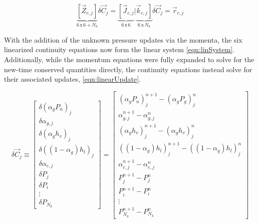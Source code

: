 \begin{equation}
\label{eqn:linSystem}
\underbrace{\left[\vec{Z}_{c, j}\right]}_{6\, \text{x}\, 6 + N_{k}} \delta \vec{C}_{j} = \underbrace{\left[\vec{J}_{c, j}\right.}_{6\, \text{x}\, 6}|{\underbrace{\left.\vec{k}_{c, j}\right]}_{6\, \text{x}\, N_{k}}}\delta \vec{C}_{j} = \vec{r}_{c,j}
\end{equation}

With the addition of the unknown pressure updates via the momenta, the six linearized continuity equations now form the linear system \eqref{eqn:linSystem}.
Additionally, while the momentum equations were fully expanded to solve for the new-time conserved quantities directly, the continuity equations instead solve for their associated updates, \eqref{eqn:linearUpdate}.

\begin{equation}
\label{eqn:linearUpdate}
\delta \vec{C}_{j} \equiv 
\begin{bmatrix}
\delta ( \alpha_{g} P_{n} )_j \\
\delta \alpha_{g, j} \\
\delta ( \alpha_{g} h_v )_j \\
\delta ( (1 - \alpha_{g} ) h_l )_j \\
\delta \alpha_{e,j} \\
\delta P_j \\ 
\delta P_i \\
\vdots \\
\delta P_{N_{k}}
\end{bmatrix}
=
\begin{bmatrix}
( \alpha_{g} P_{n})_{j}^{n+1} - (\alpha_{g} P_{g} )_{j}^{n} \\
\alpha^{n+1}_{g,j} - \alpha^{n}_{g,j} \\
( \alpha_{g} h_{v} )_{j}^{n+1} - ( \alpha_{g} h_{v} )_{j}^{n} \\
( ( 1 - \alpha_{g} ) h_{l} )_{j}^{n+1} - ( ( 1 - \alpha_{g} ) h_{l} )_{j}^{n} \\
\alpha^{n+1}_{e,j} - \alpha^{n}_{e,j} \\
 P_{j}^{n+1} - P_{j}^{n} \\
 P_{i}^{n+1} - P_{i}^{n} \\
 \vdots \\
 P_{N_{k}}^{n+1} - P_{N_{k}}^{n}
\end{bmatrix}
\end{equation}

